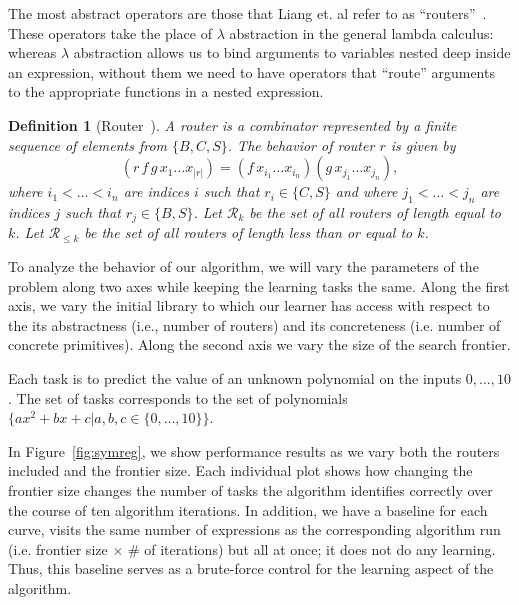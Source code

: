 \documentclass{article}
\newtheorem{definition}{Definition}
\begin{document}
The most abstract operators are those that Liang et. al refer to as
``routers''~\cite{liang10programs}. These operators take the place of
$\lambda$ abstraction in the general lambda calculus: whereas
$\lambda$ abstraction allows us to bind arguments to variables nested
deep inside an expression, without them we need to have operators that
``route'' arguments to the appropriate functions in a nested
expression. 

\begin{definition}[Router~\cite{liang10programs}] A \emph{router} is a combinator
represented by a finite sequence of elements from $\{B, C, S\}$. The
behavior of router $r$ is given by
\[
(r \, f \, g \, x_1 \dots x_{|r|}) = (f \, x_{i_1} \dots x_{i_n}) (g
\, x_{j_1} \dots x_{j_n}),
\]
where $i_1 < \dots < i_n$ are indices $i$ such that $r_i \in \{C, S\}$
and where $j_1 < \dots < j_n$ are indices $j$ such that $r_j \in \{B,
S\}$. Let $\mathcal{R}_k$ be the set of all routers of length equal to
$k$. Let $\mathcal{R}_{\leq k}$ be the set of all routers of length
less than or equal to $k$.
\end{definition}

To analyze the behavior of our algorithm, we will vary the parameters
of the problem along two axes while keeping the learning tasks the
same. Along the first axis, we vary the initial library to which our
learner has access with respect to the its abstractness (i.e., number
of routers) and its concreteness (i.e. number of concrete
primitives). Along the second axis we vary the size of the search
frontier.

Each task is to predict the value of an unknown polynomial on the
inputs $0, \dots, 10$. The set of tasks corresponds to the set of
polynomials $\{ax^2 + bx + c | a, b, c \in \{0, \dots, 10 \}\}$. 

In Figure~\ref{fig:symreg}, we show performance results as we vary
both the routers included and the frontier size. Each individual plot
shows how changing the frontier size changes the number of tasks the
algorithm identifies correctly over the course of ten algorithm
iterations. In addition, we have a baseline for each curve, visits the
same number of expressions as the corresponding algorithm run
(i.e. frontier size $\times$ $\#$ of iterations) but all at once; it
does not do any learning. Thus, this baseline serves as a brute-force
control for the learning aspect of the algorithm. 
\end{document}
